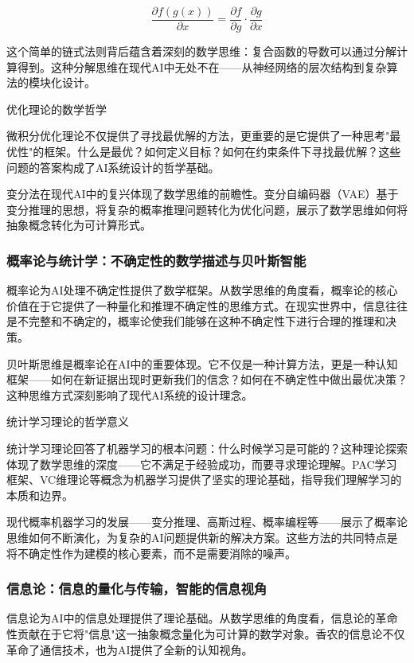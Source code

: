 $$\frac{\partial f(g(x))}{\partial x} = \frac{\partial f}{\partial g} \cdot \frac{\partial g}{\partial x}$$

这个简单的链式法则背后蕴含着深刻的数学思维：复合函数的导数可以通过分解计算得到。这种分解思维在现代AI中无处不在——从神经网络的层次结构到复杂算法的模块化设计。

优化理论的数学哲学

微积分优化理论不仅提供了寻找最优解的方法，更重要的是它提供了一种思考"最优性"的框架。什么是最优？如何定义目标？如何在约束条件下寻找最优解？这些问题的答案构成了AI系统设计的哲学基础。

变分法在现代AI中的复兴体现了数学思维的前瞻性。变分自编码器（VAE）基于变分推理的思想，将复杂的概率推理问题转化为优化问题，展示了数学思维如何将抽象概念转化为可计算形式。

\subsubsection{概率论与统计学：不确定性的数学描述与贝叶斯智能}

概率论为AI处理不确定性提供了数学框架。从数学思维的角度看，概率论的核心价值在于它提供了一种量化和推理不确定性的思维方式。在现实世界中，信息往往是不完整和不确定的，概率论使我们能够在这种不确定性下进行合理的推理和决策。

贝叶斯思维是概率论在AI中的重要体现。它不仅是一种计算方法，更是一种认知框架——如何在新证据出现时更新我们的信念？如何在不确定性中做出最优决策？这种思维方式深刻影响了现代AI系统的设计理念。

统计学习理论的哲学意义

统计学习理论回答了机器学习的根本问题：什么时候学习是可能的？这种理论探索体现了数学思维的深度——它不满足于经验成功，而要寻求理论理解。PAC学习框架、VC维理论等概念为机器学习提供了坚实的理论基础，指导我们理解学习的本质和边界。

现代概率机器学习的发展——变分推理、高斯过程、概率编程等——展示了概率论思维如何不断演化，为复杂的AI问题提供新的解决方案。这些方法的共同特点是将不确定性作为建模的核心要素，而不是需要消除的噪声。

\subsubsection{信息论：信息的量化与传输，智能的信息视角}

信息论为AI中的信息处理提供了理论基础。从数学思维的角度看，信息论的革命性贡献在于它将"信息"这一抽象概念量化为可计算的数学对象。香农的信息论不仅革命了通信技术，也为AI提供了全新的认知视角。

